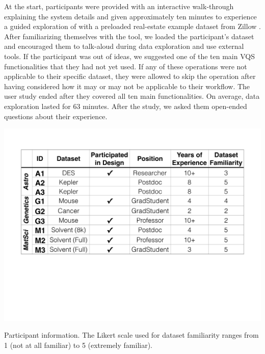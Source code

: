 \par At the start, participants were provided with an interactive walk-through explaining the system details and given approximately ten minutes to experience a guided exploration of \zvpp with a preloaded real-estate example dataset from Zillow \cite{zillow}. After familiarizing themselves with the tool, we loaded the participant's dataset and encouraged them to talk-aloud during data exploration and use external tools. If the participant was out of ideas, we suggested one of the ten main VQS functionalities that they had not yet used. If any of these operations were not applicable to their specific dataset, they were allowed to skip the operation after having considered how it may or may not be applicable to their workflow. The user study ended after they covered all ten main functionalities. On average, data exploration lasted for 63 minutes. After the study, we asked them open-ended questions about their experience.%
\begin{table}[h!]
\centering
\vspace{-10pt}
\includegraphics[width=\linewidth]{figures/participant_info.pdf}
\caption{Participant information. The Likert scale used for dataset familiarity ranges from 1 (not at all familiar) to 5 (extremely familiar).}
\label{participants}
\vspace{-15pt}
\end{table}